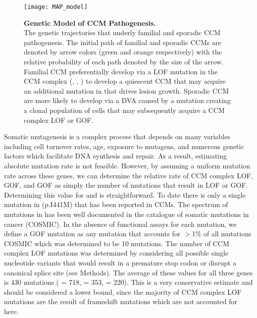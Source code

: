 \begin{figure}[t!]
\centering
\texttt{[image: MAP\_model]}
\caption[Genetic Model of CCM Pathogenesis]{\textbf{Genetic Model of CCM Pathogenesis. \\} 
The genetic trajectories that underly familial and sporadic CCM pathogenesis. The initial path of familial and sporadic CCMs are denoted by arrow colors (green and orange respectively) with the relative probability of each path denoted by the size of the arrow. Familial CCM preferentially develop via a LOF mutation in the CCM complex (, , ) to develop a quiescent CCM that may acquire an additional mutation in  that drives lesion growth. Sporadic CCM are more likely to develop via a DVA caused by a  mutation creating a clonal population of cells that may subsequently acquire a CCM complex LOF or  GOF. }

\label{MAP_model}
\end{figure}

Somatic mutagenesis is a complex process that depends on many variables including cell turnover rates, age, exposure to mutagens, and numerous genetic factors which facilitate DNA synthesis and repair. As a result, estimating absolute mutation rate is not feasible. However, by assuming a uniform mutation rate across these genes, we can determine the relative rate of CCM complex LOF,  GOF, and  GOF as simply the number of mutations that result in LOF or GOF. Determining this value for  and  is straightforward. To date there is only a single mutation in  (p.I441M) that has been reported in CCMs. The spectrum of mutations in  has been well documented in the catalogue of somatic mutations in cancer (COSMIC). In the absence of functional assays for each mutation, we define a GOF mutation as any mutation that accounts for $>$1\% of all  mutations COSMIC which was determined to be 10 mutations. The number of CCM complex LOF mutations was determined by considering all possible single nucleotide variants that would result in a premature stop codon or disrupt a canonical splice site (see Methods). The average of these values for all three genes is 430 mutations ( = 718,  = 353,  = 220). This is a very conservative estimate and should be considered a lower bound, since the majority of CCM complex LOF mutations are the result of frameshift mutations which are not accounted for here. 

